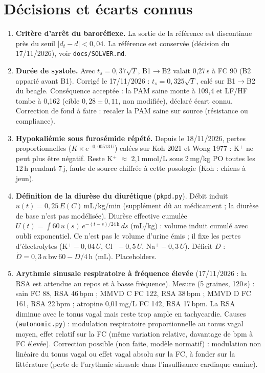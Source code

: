 \documentclass[11pt,a4paper]{article}
\begin{document}
\section{Décisions et écarts connus}
\begin{enumerate}
  \item \textbf{Critère d'arrêt du baroréflexe.} La sortie de la référence est discontinue près du seuil $|d_t-d|<0{,}04$. La référence est conservée (décision du 17/11/2026), voir \texttt{docs/SOLVER.md}.
  \item \textbf{Durée de systole.} Avec $t_s = 0{,}37\sqrt{T}$, B1$\to$B2 valait 0,27\,s à FC 90 (B2 apparié avant B1). Corrigé le 17/11/2026 : $t_s = 0{,}325\sqrt{T}$, calé sur B1$\to$B2 du beagle. Conséquence acceptée : la PAM saine monte à 109,4 et LF/HF tombe à 0,162 (cible $0{,}28\pm0{,}11$, non modifiée), déclaré écart connu. Correction de fond à faire : recaler la PAM saine sur source (résistance ou compliance).
  \item \textbf{Hypokaliémie sous furosémide répété.} Depuis le 18/11/2026, pertes proportionnelles ($K \times e^{-0{,}00513\,U}$) calées sur Koh 2021 et Wong 1977 : K$^+$ ne peut plus être négatif. Reste K$^+$ $\approx$ 2,1\,mmol/L sous 2\,mg/kg PO toutes les 12\,h pendant 7\,j, faute de source chiffrée à cette posologie (Koh : chiens à jeun).
  \item \textbf{Définition de la diurèse du diurétique} (\texttt{pkpd.py}). Débit induit $u(t)=0{,}25\,E(C)$\,mL/kg/min (supplément dû au médicament ; la diurèse de base n'est pas modélisée). \og Diurèse effective cumulée\fg{} $U(t)=\int 60\,u(s)\,e^{-(t-s)/24\,\mathrm{h}}\,ds$ (mL/kg) : volume induit cumulé avec oubli exponentiel. Ce n'est pas le volume d'urine émis ; il fixe les pertes d'électrolytes (K$^+ - 0{,}04\,U$, Cl$^- - 0{,}5\,U$, Na$^+ - 0{,}3\,U$). Déficit $D$ : $\dot D = 0{,}3\,u\,\mathrm{bw}\,60 - D/4\,\mathrm{h}$ (mL). Placeholders.
  \item \textbf{Arythmie sinusale respiratoire à fréquence élevée} (17/11/2026 : la RSA est attendue au repos et à basse fréquence). Mesure (5 graines, 120\,s) : sain FC 88, RSA 46\,bpm ; MMVD C FC 122, RSA 38\,bpm ; MMVD D FC 161, RSA 22\,bpm ; atropine 0,01\,mg/L FC 142, RSA 17\,bpm. La RSA diminue avec le tonus vagal mais reste trop ample en tachycardie. Causes (\texttt{autonomic.py}) : modulation respiratoire proportionnelle au tonus vagal moyen, effet relatif sur la FC (même variation relative, davantage de bpm à FC élevée). Correction possible (non faite, modèle normatif) : modulation non linéaire du tonus vagal ou effet vagal absolu sur la FC, à fonder sur la littérature (perte de l'arythmie sinusale dans l'insuffisance cardiaque canine).

\end{enumerate}
\end{document}
